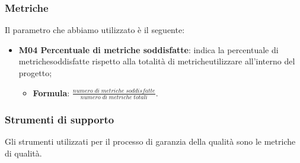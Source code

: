 \subsubsection{Metriche} 
Il parametro che abbiamo utilizzato è il seguente:
	\begin{itemize}
		\item \textbf{M04 Percentuale di metriche soddisfatte}: indica la percentuale di metriche\glosp soddisfatte rispetto alla totalità di metriche\glosp utilizzare all'interno del progetto\glo;
		\begin{itemize}
			\item[] \textbf{Formula}: $\frac{numero \; di \; metriche \; soddisfatte}{numero \; di \; metriche \; totali}$.
		\end{itemize}
	\end{itemize}
\subsubsection{Strumenti di supporto}
Gli strumenti utilizzati per il processo di garanzia della qualità sono le metriche di qualità.
